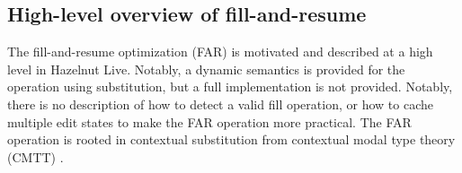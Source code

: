 \subsection{High-level overview of fill-and-resume}
\label{sec:hazelnut-live-far}

The fill-and-resume optimization (FAR) is motivated and described at a high level in Hazelnut Live. Notably, a dynamic semantics is provided for the operation using substitution, but a full implementation is not provided. Notably, there is no description of how to detect a valid fill operation, or how to cache multiple edit states to make the FAR operation more practical. The FAR operation is rooted in contextual substitution from contextual modal type theory (CMTT) \cite{nanevski2008contextual}.


